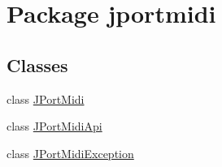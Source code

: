 \hypertarget{namespacejportmidi}{}\section{Package jportmidi}
\label{namespacejportmidi}
\subsection*{Classes}
\begin{DoxyCompactItemize}
\item 
class \hyperlink{classjportmidi_1_1_j_port_midi}{J\+Port\+Midi}
\item 
class \hyperlink{classjportmidi_1_1_j_port_midi_api}{J\+Port\+Midi\+Api}
\item 
class \hyperlink{classjportmidi_1_1_j_port_midi_exception}{J\+Port\+Midi\+Exception}
\end{DoxyCompactItemize}
